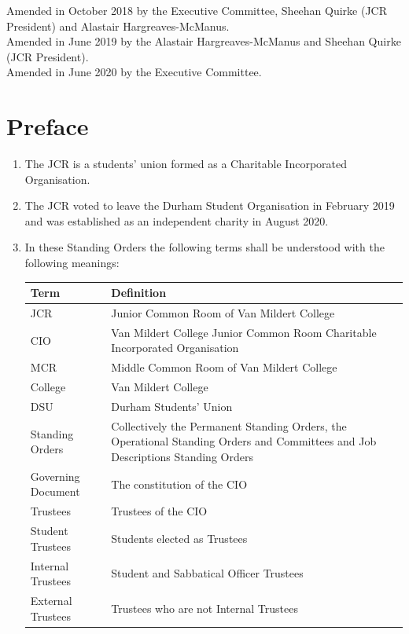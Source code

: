 \documentclass[12pt]{article}
\begin{document}
Amended in October 2018 by the Executive Committee, Sheehan Quirke (JCR President) and Alastair Hargreaves-McManus.\\
Amended in June 2019 by the Alastair Hargreaves-McManus and Sheehan Quirke (JCR President).\\
Amended in June 2020 by the Executive Committee.
\newpage
\tableofcontents{}
\newpage


\section{Preface}
\begin{enumerate}
    \item The JCR is a students' union formed as a Charitable Incorporated Organisation.
    \item The JCR voted to leave the Durham Student Organisation in February 2019 and was established as an independent charity in August 2020.
    \item In these Standing Orders the following terms shall be understood with the following meanings:\\
\begin{tabular}{|p{1.5in}|p{3.8in}|}\hline
    \textbf{Term}           & \textbf{Definition}\\ \hline
    JCR                     & Junior Common Room of Van Mildert College\\ \hline
    CIO						& Van Mildert College Junior Common Room  Charitable Incorporated Organisation\\\hline
    MCR                     & Middle Common Room of Van Mildert College\\\hline
    College                 & Van Mildert College\\ \hline
    DSU                     & Durham Students' Union\\ \hline
    Standing Orders         & Collectively the Permanent Standing Orders, the Operational Standing Orders and Committees and Job Descriptions Standing Orders \\ \hline
    Governing Document      & The constitution of the CIO\\\hline
    Trustees				& Trustees of the CIO\\\hline
    Student Trustees		& Students elected as Trustees\\\hline
    Internal Trustees		& Student and Sabbatical Officer Trustees\\\hline
    External Trustees		& Trustees who are not Internal Trustees\\\hline

\end{tabular}
\end{enumerate}
\end{document}
